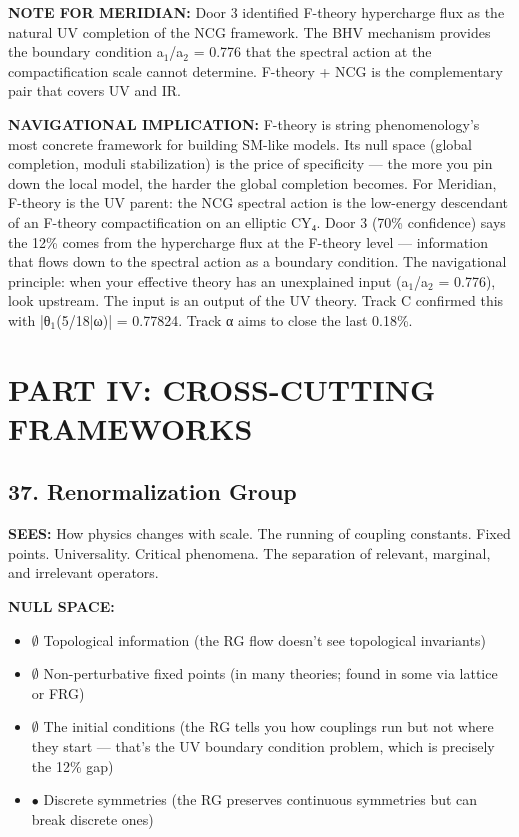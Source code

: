 \textbf{NOTE FOR MERIDIAN:} Door 3 identified F-theory hypercharge flux as the natural UV completion of the NCG framework. The BHV mechanism provides the boundary condition a$_1$/a$_2$ = 0.776 that the spectral action at the compactification scale cannot determine. F-theory + NCG is the complementary pair that covers UV and IR.


\textbf{NAVIGATIONAL IMPLICATION:} F-theory is string phenomenology's most concrete framework for building SM-like models. Its null space (global completion, moduli stabilization) is the price of specificity — the more you pin down the local model, the harder the global completion becomes. For Meridian, F-theory is the UV parent: the NCG spectral action is the low-energy descendant of an F-theory compactification on an elliptic CY₄. Door 3 (70\% confidence) says the 12\% comes from the hypercharge flux at the F-theory level — information that flows down to the spectral action as a boundary condition. The navigational principle: when your effective theory has an unexplained input (a$_1$/a$_2$ = 0.776), look upstream. The input is an output of the UV theory. Track C confirmed this with |θ$_1$(5/18|ω)| = 0.77824. Track α aims to close the last 0.18\%.


\bigskip\noindent\makebox[\textwidth]{\color{rulegray}\rule{5cm}{0.3pt}}\bigskip


\chapter*{PART IV: CROSS-CUTTING FRAMEWORKS}


\section*{37. Renormalization Group}


\textbf{SEES:} How physics changes with scale. The running of coupling constants. Fixed points. Universality. Critical phenomena. The separation of relevant, marginal, and irrelevant operators.


\textbf{NULL SPACE:}

\begin{itemize}[nosep,leftmargin=*]
  \item $\emptyset$ Topological information (the RG flow doesn't see topological invariants)
  \item $\emptyset$ Non-perturbative fixed points (in many theories; found in some via lattice or FRG)
  \item $\emptyset$ The initial conditions (the RG tells you how couplings run but not where they start — that's the UV boundary condition problem, which is precisely the 12\% gap)
  \item $\bullet$ Discrete symmetries (the RG preserves continuous symmetries but can break discrete ones)
\end{itemize}



